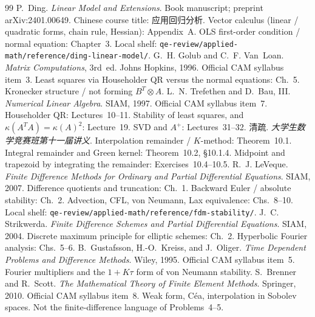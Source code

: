 \documentclass[11pt,a4paper]{article}
\begin{document}
\begin{thebibliography}{99}
P.~Ding.
\newblock \emph{Linear Model and Extensions}.
\newblock Book manuscript; preprint arXiv:2401.00649. Chinese course title: 应用回归分析.
\newblock Vector calculus (linear / quadratic forms, chain rule, Hessian): Appendix~A. OLS first-order condition / normal equation: Chapter~3. Local shelf: \texttt{qe-review/applied-math/reference/ding-linear-model/}.
G.~H. Golub and C.~F. Van~Loan.
\newblock \emph{Matrix Computations}, 3rd~ed.
\newblock Johns Hopkins, 1996.
\newblock Official CAM syllabus item~3. Least squares via Householder QR versus the normal equations: Ch.~5. Kronecker structure / not forming \(B^{T}\otimes A\).
L.~N. Trefethen and D.~Bau, III.
\newblock \emph{Numerical Linear Algebra}.
\newblock SIAM, 1997.
\newblock Official CAM syllabus item~7. Householder QR: Lectures~10--11. Stability of least squares, and \(\kappa(A^{T}A)=\kappa(A)^{2}\): Lecture~19. SVD and \(A^{+}\): Lectures~31--32.
清疏.
\newblock \emph{大学生数学竞赛班第十一届讲义}.
\newblock Interpolation remainder / \(K\)-method: Theorem~10.1. Integral remainder and Green kernel: Theorem~10.2, \S10.1.4. Midpoint and trapezoid by integrating the remainder: Exercises~10.4--10.5.
R.~J. LeVeque.
\newblock \emph{Finite Difference Methods for Ordinary and Partial Differential Equations}.
\newblock SIAM, 2007.
\newblock Difference quotients and truncation: Ch.~1. Backward Euler / absolute stability: Ch.~2. Advection, CFL, von Neumann, Lax equivalence: Chs.~8--10. Local shelf: \texttt{qe-review/applied-math/reference/fdm-stability/}.
J.~C. Strikwerda.
\newblock \emph{Finite Difference Schemes and Partial Differential Equations}.
\newblock SIAM, 2004.
\newblock Discrete maximum principle for elliptic schemes: Ch.~2. Hyperbolic Fourier analysis: Chs.~5--6.
B.~Gustafsson, H.-O.~Kreiss, and J.~Oliger.
\newblock \emph{Time Dependent Problems and Difference Methods}.
\newblock Wiley, 1995.
\newblock Official CAM syllabus item~5. Fourier multipliers and the \(1+K\tau\) form of von Neumann stability.
S.~Brenner and R.~Scott.
\newblock \emph{The Mathematical Theory of Finite Element Methods}.
\newblock Springer, 2010.
\newblock Official CAM syllabus item~8. Weak form, C\'ea, interpolation in Sobolev spaces. Not the finite-difference language of Problems~4--5.

\end{thebibliography}
\end{document}
